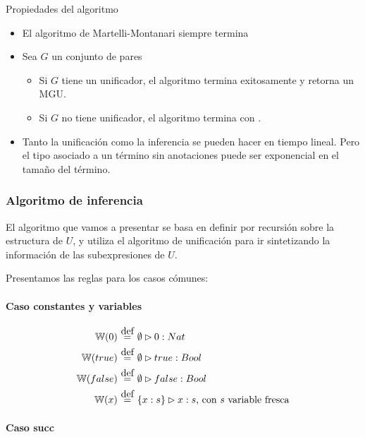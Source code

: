 \begin{teo}
  Propiedades del algoritmo
  \begin{itemize}
    \item El algoritmo de Martelli-Montanari siempre termina
    \item Sea $G$ un conjunto de pares
      \begin{itemize}
        \item Si $G$ tiene un unificador, el algoritmo termina exitosamente y retorna un MGU.
        \item Si $G$ no tiene unificador, el algoritmo termina con .
      \end{itemize}
    \item Tanto la unificación como la inferencia se pueden hacer en tiempo lineal. Pero el tipo asociado a un término sin anotaciones puede ser exponencial en el tamaño del término.
  \end{itemize}
\end{teo}

\subsubsection{Algoritmo de inferencia}

El algoritmo que vamos a presentar se basa en definir  por recursión sobre la estructura de $U$, y utiliza el algoritmo de unificación para ir sintetizando la información de las subexpresiones de $U$.

Presentamos las reglas para los casos cómunes:

\paragraph{Caso constantes y variables}

\begin{align*}
  \w{0} &\eqdef \emptyset \rhd 0 : Nat \\
  \w{true} &\eqdef \emptyset \rhd true : Bool \\
  \w{false} &\eqdef \emptyset \rhd false : Bool \\
  \w{x} &\eqdef \{x:s\} \rhd x : s \text{, con $s$ variable fresca} \\
\end{align*}

\paragraph{Caso succ}

